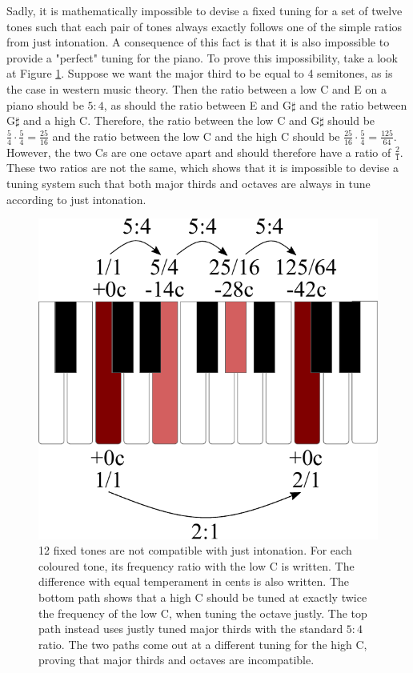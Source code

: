 \documentclass[a4paper]{article}
\begin{document}
Sadly, it is mathematically impossible to devise a fixed tuning for a set of twelve tones such that each pair of tones always exactly follows one of the simple ratios from just intonation. A consequence of this fact is that it is also impossible to provide a "perfect" tuning for the piano. To prove this impossibility, take a look at Figure \ref{fig:thirdsproof}. Suppose we want the major third to be equal to 4 semitones, as is the case in western music theory. Then the ratio between a low C and E on a piano should be $5:4$, as should the ratio between E and G$\sharp$ and the ratio between G$\sharp$ and a high C. Therefore, the ratio between the low C and G$\sharp$ should be $\frac54 \cdot \frac54 = \frac{25}{16}$ and the ratio between the low C and the high C should be $\frac{25}{16} \cdot \frac54 = \frac{125}{64}$. However, the two Cs are one octave apart and should therefore have a ratio of $\frac21$. These two ratios are not the same, which shows that it is impossible to devise a tuning system such that both major thirds and octaves are always in tune according to just intonation.

\begin{figure}
	\centering
	\includegraphics[scale=0.5]{Figures/ThirdsProof.pdf}
	\caption{12 fixed tones are not compatible with just intonation. For each coloured tone, its frequency ratio with the low C is written. The difference with equal temperament in cents is also written. The bottom path shows that a high C should be tuned at exactly twice the frequency of the low C, when tuning the octave justly. The top path instead uses justly tuned major thirds with the standard $5:4$ ratio. The two paths come out at a different tuning for the high C, proving that major thirds and octaves are incompatible.}
	\label{fig:thirdsproof}
\end{figure}
\end{document}
